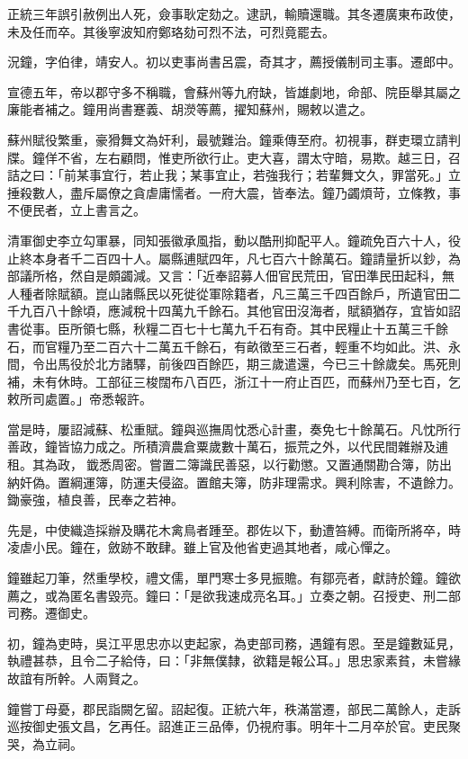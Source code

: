 \begin{pinyinscope}
正統三年誤引赦例出人死，僉事耿定劾之。逮訊，輸贖還職。其冬遷廣東布政使，未及任而卒。其後寧波知府鄭珞劾可烈不法，可烈竟罷去。

況鐘，字伯律，靖安人。初以吏事尚書呂震，奇其才，薦授儀制司主事。遷郎中。

宣德五年，帝以郡守多不稱職，會蘇州等九府缺，皆雄劇地，命部、院臣舉其屬之廉能者補之。鐘用尚書蹇義、胡濙等薦，擢知蘇州，賜敕以遣之。

蘇州賦役繁重，豪猾舞文為奸利，最號難治。鐘乘傳至府。初視事，群吏環立請判牒。鐘佯不省，左右顧問，惟吏所欲行止。吏大喜，謂太守暗，易欺。越三日，召詰之曰：「前某事宜行，若止我；某事宜止，若強我行；若輩舞文久，罪當死。」立捶殺數人，盡斥屬僚之貪虐庸懦者。一府大震，皆奉法。鐘乃蠲煩苛，立條教，事不便民者，立上書言之。

清軍御史李立勾軍暴，同知張徽承風指，動以酷刑抑配平人。鐘疏免百六十人，役止終本身者千二百四十人。屬縣逋賦四年，凡七百六十餘萬石。鐘請量折以鈔，為部議所格，然自是頗蠲減。又言：「近奉詔募人佃官民荒田，官田準民田起科，無人種者除賦額。崑山諸縣民以死徙從軍除籍者，凡三萬三千四百餘戶，所遺官田二千九百八十餘頃，應減稅十四萬九千餘石。其他官田沒海者，賦額猶存，宜皆如詔書從事。臣所領七縣，秋糧二百七十七萬九千石有奇。其中民糧止十五萬三千餘石，而官糧乃至二百六十二萬五千餘石，有畝徵至三石者，輕重不均如此。洪、永間，令出馬役於北方諸驛，前後四百餘匹，期三歲遣還，今已三十餘歲矣。馬死則補，未有休時。工部征三梭闊布八百匹，浙江十一府止百匹，而蘇州乃至七百，乞敕所司處置。」帝悉報許。

當是時，屢詔減蘇、松重賦。鐘與巡撫周忱悉心計畫，奏免七十餘萬石。凡忱所行善政，鐘皆協力成之。所積濟農倉粟歲數十萬石，振荒之外，以代民間雜辦及逋租。其為政，韱悉周密。嘗置二簿識民善惡，以行勸懲。又置通關勘合簿，防出納奸偽。置綱運簿，防運夫侵盜。置館夫簿，防非理需求。興利除害，不遺餘力。鋤豪強，植良善，民奉之若神。

先是，中使織造採辦及購花木禽鳥者踵至。郡佐以下，動遭笞縛。而衛所將卒，時凌虐小民。鐘在，斂跡不敢肆。雖上官及他省吏過其地者，咸心憚之。

鐘雖起刀筆，然重學校，禮文儒，單門寒士多見振贍。有鄒亮者，獻詩於鐘。鐘欲薦之，或為匿名書毀亮。鐘曰：「是欲我速成亮名耳。」立奏之朝。召授吏、刑二部司務。遷御史。

初，鐘為吏時，吳江平思忠亦以吏起家，為吏部司務，遇鐘有恩。至是鐘數延見，執禮甚恭，且令二子給侍，曰：「非無僕隸，欲籍是報公耳。」思忠家素貧，未嘗緣故誼有所幹。人兩賢之。

鐘嘗丁母憂，郡民詣闕乞留。詔起復。正統六年，秩滿當遷，部民二萬餘人，走訴巡按御史張文昌，乞再任。詔進正三品俸，仍視府事。明年十二月卒於官。吏民聚哭，為立祠。


\end{pinyinscope}
